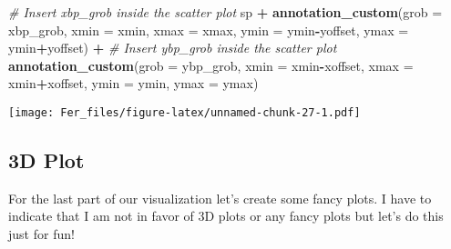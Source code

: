 \documentclass[
]{article}
\newenvironment{Shaded}{\begin{snugshade}}{\end{snugshade}}
\newcommand{\AttributeTok}[1]{\textcolor[rgb]{0.13,0.29,0.53}{#1}}
\newcommand{\CommentTok}[1]{\textcolor[rgb]{0.56,0.35,0.01}{\textit{#1}}}
\newcommand{\DecValTok}[1]{\textcolor[rgb]{0.00,0.00,0.81}{#1}}
\newcommand{\FunctionTok}[1]{\textcolor[rgb]{0.13,0.29,0.53}{\textbf{#1}}}
\newcommand{\NormalTok}[1]{#1}
\newcommand{\SpecialCharTok}[1]{\textcolor[rgb]{0.81,0.36,0.00}{\textbf{#1}}}
\newcommand{\StringTok}[1]{\textcolor[rgb]{0.31,0.60,0.02}{#1}}
\begin{document}
\begin{Shaded}
\begin{Highlighting}[]
\CommentTok{\# Insert xbp\_grob inside the scatter plot}
\NormalTok{sp }\SpecialCharTok{+} \FunctionTok{annotation\_custom}\NormalTok{(}\AttributeTok{grob =}\NormalTok{ xbp\_grob, }\AttributeTok{xmin =}\NormalTok{ xmin, }\AttributeTok{xmax =}\NormalTok{ xmax, }
                       \AttributeTok{ymin =}\NormalTok{ ymin}\SpecialCharTok{{-}}\NormalTok{yoffset, }\AttributeTok{ymax =}\NormalTok{ ymin}\SpecialCharTok{+}\NormalTok{yoffset) }\SpecialCharTok{+}
  \CommentTok{\# Insert ybp\_grob inside the scatter plot}
  \FunctionTok{annotation\_custom}\NormalTok{(}\AttributeTok{grob =}\NormalTok{ ybp\_grob,}
                    \AttributeTok{xmin =}\NormalTok{ xmin}\SpecialCharTok{{-}}\NormalTok{xoffset, }\AttributeTok{xmax =}\NormalTok{ xmin}\SpecialCharTok{+}\NormalTok{xoffset, }
                    \AttributeTok{ymin =}\NormalTok{ ymin, }\AttributeTok{ymax =}\NormalTok{ ymax)}
\end{Highlighting}
\end{Shaded}

\texttt{[image: Fer\_files/figure-latex/unnamed-chunk-27-1.pdf]}

\subsection{3D Plot}\label{d-plot}

For the last part of our visualization let's create some fancy plots. I
have to indicate that I am not in favor of 3D plots or any fancy plots
but let's do this just for fun!

\begin{Shaded}
\end{Shaded}
\end{document}
